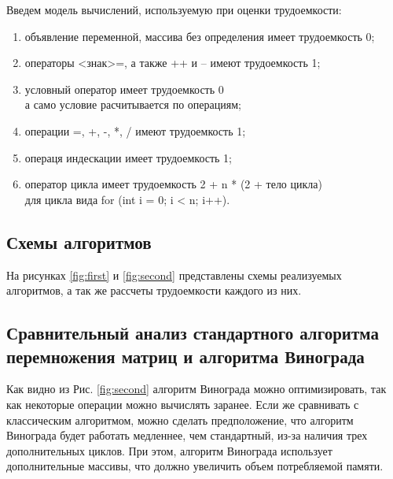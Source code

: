 \documentclass[12pt,a4paper]{scrartcl}
\begin{document}
Введем модель вычислений, используемую при оценки трудоемкости:

\begin{enumerate}
	\item {объявление переменной, массива без определения имеет трудоемкость 0; }
	\item {операторы <знак>=, а также ++ и -- имеют трудоемкость 1; }
	\item {условный оператор имеет трудоемкость 0 \\ а само условие расчитывается по операциям; }
	\item {операции =, +, -, *, / имеют трудоемкость 1; }
	\item {операця индескации имеет трудоемкость 1; }
	\item {оператор цикла имеет трудоемкость 2 + n * (2 + тело цикла) \\ для цикла вида for (int i = 0; i < n; i++).}	
\end{enumerate}
	
	\subsection{Схемы алгоритмов}
	\label{sec:construct:schemes}
	
	На рисунках \ref{fig:first} и \ref{fig:second} представлены схемы реализуемых алгоритмов, а так же рассчеты трудоемкости каждого из них.
	
	\begin{center}
		\centering
		\label{fig:first}
	\end{center}
	
	
	\begin{center}
		\centering
		\label{fig:second}
	\end{center}
	
	\newpage
	\subsection{Сравнительный анализ стандартного алгоритма перемножения матриц и алгоритма Винограда}
	\label{sec:construct:compare}
	
	Как видно из Рис. \ref{fig:second} алгоритм Винограда можно оптимизировать, так как некоторые операции можно вычислять заранее. 
 Если же сравнивать с классическим алгоритмом, можно сделать предположение, что алгоритм Винограда будет работать медленнее, чем стандартный, из-за наличия трех дополнительных циклов. 
 При этом, алгоритм Винограда использует дополнительные массивы, что должно увеличить объем потребляемой памяти. 
 
\end{document}
